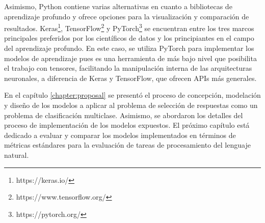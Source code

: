 Asimismo, Python contiene varias alternativas en cuanto a bibliotecas de aprendizaje profundo y ofrece opciones para la visualización y comparación de resultados. Keras\footnote{https://keras.io/}, TensorFlow\footnote{https://www.tensorflow.org/} y PyTorch\footnote{https://pytorch.org/} se encuentran entre los tres marcos principales preferidos por los científicos de datos y los principiantes en el campo del aprendizaje profundo. En este caso, se utiliza PyTorch para implementar los modelos de aprendizaje pues es una herramienta de más bajo nivel que posibilita el trabajo con tensores, facilitando la manipulación interna de las arquitecturas neuronales, a diferencia de Keras y TensorFlow, que ofrecen APIs más generales.

En el capítulo \ref{chapter:proposal} se presentó el proceso de concepción, modelación y diseño de los modelos a aplicar al problema de selección de respuestas como un problema de clasificación multiclase. Asimismo, se abordaron los detalles del proceso de implementación de los modelos expuestos. El próximo capítulo está dedicado a evaluar y comparar los modelos implementados en términos de métricas estándares para la evaluación de tareas de procesamiento del lenguaje natural.





